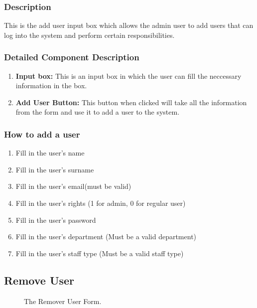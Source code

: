 \documentclass[14pt, a4paper]{article}
\begin{document}
	\subsubsection{Description} This is the add user input box which allows the admin user to add users that can log into the system and perform certain responsibilities.
	\subsubsection{Detailed Component Description}
		\begin{enumerate}
			\item \textbf{Input box:} This is an input box in which the user can fill the neccessary information in the box.
			\item \textbf{Add User Button:} This button when clicked will take all the information from the form and use it to add a user to the system.
		\end{enumerate}
	\subsubsection{How to add a user}
		\begin{enumerate}
			\item Fill in the user's name
			\item Fill in the user's surname
			\item Fill in the user's email(must be valid)
			\item Fill in the user's rights (1 for admin, 0 for regular user)
			\item Fill in the user's password
			\item Fill in the user's department (Must be a valid department)
			\item Fill in the user's staff type (Must be a valid staff type)
		\end{enumerate}
\subsection{Remove User}
	\begin{figure}[H]
		\centerline{}
		\caption{The Remover User Form.}
  		\label{fig:removeUser1}
	\end{figure}
\end{document}
